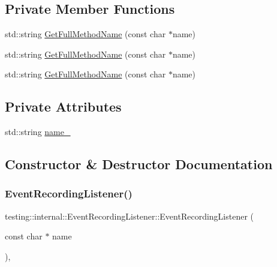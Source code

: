 \subsection*{Private Member Functions}
\begin{DoxyCompactItemize}
\item 
std\+::string \mbox{\hyperlink{classtesting_1_1internal_1_1_event_recording_listener_a3d6212ced3e7a32e0e5944f2eba47c0b}{Get\+Full\+Method\+Name}} (const char $\ast$name)
\item 
std\+::string \mbox{\hyperlink{classtesting_1_1internal_1_1_event_recording_listener_a3d6212ced3e7a32e0e5944f2eba47c0b}{Get\+Full\+Method\+Name}} (const char $\ast$name)
\item 
std\+::string \mbox{\hyperlink{classtesting_1_1internal_1_1_event_recording_listener_a3d6212ced3e7a32e0e5944f2eba47c0b}{Get\+Full\+Method\+Name}} (const char $\ast$name)
\end{DoxyCompactItemize}
\subsection*{Private Attributes}
\begin{DoxyCompactItemize}
\item 
std\+::string \mbox{\hyperlink{classtesting_1_1internal_1_1_event_recording_listener_ad65961b8f32b63cffd46c8820256a88f}{name\+\_\+}}
\end{DoxyCompactItemize}


\subsection{Constructor \& Destructor Documentation}
\mbox{\label{classtesting_1_1internal_1_1_event_recording_listener_a7b0254c15d6b8468e1441ee572fee707}} 
\subsubsection{\texorpdfstring{EventRecordingListener()}{EventRecordingListener()}\hspace{0.1cm}{\footnotesize\ttfamily [1/3]}}
{\footnotesize\ttfamily testing\+::internal\+::\+Event\+Recording\+Listener\+::\+Event\+Recording\+Listener (\begin{DoxyParamCaption}\item[{const char $\ast$}]{name }\end{DoxyParamCaption})\hspace{0.3cm}{\ttfamily [inline]}, {\ttfamily [explicit]}}

